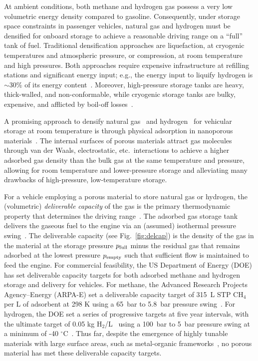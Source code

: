 At ambient conditions, both methane and hydrogen gas possess a very low
volumetric energy density compared to gasoline. Consequently, under storage
space constraints in passenger vehicles, natural gas and hydrogen must be
densified for onboard storage to achieve a reasonable driving range on a
``full'' tank of fuel. Traditional densification approaches are liquefaction,
at cryogenic temperatures and atmospheric pressure, or compression, at room
temperature and high pressures. Both approaches require expensive
infrastructure at refilling stations and significant energy input; e.g., the
energy input to liquify hydrogen is $\sim$30\% of its energy
content~\cite{bossel2003energy}. Moreover, high-pressure storage tanks are
heavy, thick-walled, and non-conformable, while cryogenic storage tanks are
bulky, expensive, and afflicted by boil-off losses~\cite{hasan2009minimizing}.

A promising approach to densify natural
gas~\cite{makal2012methane,mason2014evaluating} and
hydrogen~\cite{suh2011hydrogen,garcia2018benchmark} for vehicular storage at
room temperature is through physical adsorption in nanoporous
materials~\cite{schoedel2016role}. The internal surfaces of porous materials
attract gas molecules through van der Waals, electrostatic, etc.\ interactions
to achieve a higher adsorbed gas density than the bulk gas at the same
temperature and pressure, allowing for room temperature and lower-pressure
storage and alleviating many drawbacks of high-pressure, low-temperature
storage.

For a vehicle employing a porous material to store natural gas or hydrogen, the
(volumetric) \emph{deliverable capacity} of the gas is the primary
thermodynamic property that determines the driving
range~\cite{mason2014evaluating}. The adsorbed gas storage tank delivers the
gaseous fuel to the engine via an (assumed) isothermal pressure
swing~\cite{sircar2002pressure}. The deliverable capacity (see
Fig.~\ref{fig:delcap}) is the density of the gas in the material at the storage
pressure $p_{\text{full}}$ minus the residual gas that remains adsorbed at the lowest
pressure $p_{\text{empty}}$ such that sufficient flow is maintained to feed the engine.
For commercial feasibility, the US Department of Energy (DOE) has set
deliverable capacity targets for both adsorbed methane and hydrogen storage and
delivery for vehicles. For methane, the Advanced Research Projects
Agency--Energy (ARPA-E) set a deliverable capacity target of 315\ L STP CH$_4$
per L of adsorbent at 298 K using a 65\ bar to 5.8\ bar pressure
swing~\cite{simon2015materials}. For hydrogen, the DOE set a series of
progressive targets at five year intervals, with the ultimate target of 0.05 kg
H$_2$/L~\cite{h2targetsDOE} using a 100\ bar to 5\ bar pressure swing at a
minimum of -40 $^\circ$C~\cite{allendorf2018assessment}. Thus far, despite the
emergence of highly tunable materials with large surface areas, such as
metal-organic frameworks~\cite{furukawa2013chemistry}, no porous material has
met these deliverable capacity targets.

